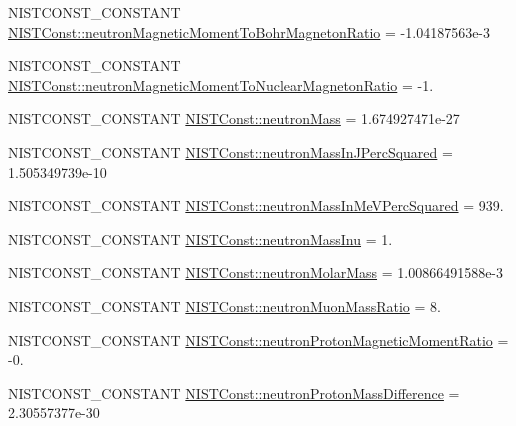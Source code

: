 \begin{DoxyCompactItemize}
\item 
N\+I\+S\+T\+C\+O\+N\+S\+T\+\_\+\+C\+O\+N\+S\+T\+A\+NT \mbox{\hyperlink{group___n_i_s_t_const-_neutron_gab8bdbec377228e9e15b00ca4d0a0a3c0}{N\+I\+S\+T\+Const\+::neutron\+Magnetic\+Moment\+To\+Bohr\+Magneton\+Ratio}} = -\/1.\+04187563e-\/3
\item 
N\+I\+S\+T\+C\+O\+N\+S\+T\+\_\+\+C\+O\+N\+S\+T\+A\+NT \mbox{\hyperlink{group___n_i_s_t_const-_neutron_ga37a4e076d3bfff8197cbd9cdebd2daef}{N\+I\+S\+T\+Const\+::neutron\+Magnetic\+Moment\+To\+Nuclear\+Magneton\+Ratio}} = -\/1.
\item 
N\+I\+S\+T\+C\+O\+N\+S\+T\+\_\+\+C\+O\+N\+S\+T\+A\+NT \mbox{\hyperlink{group___n_i_s_t_const-_neutron_gaff4987a18b550937fb56b37afd74f550}{N\+I\+S\+T\+Const\+::neutron\+Mass}} = 1.\+674927471e-\/27
\item 
N\+I\+S\+T\+C\+O\+N\+S\+T\+\_\+\+C\+O\+N\+S\+T\+A\+NT \mbox{\hyperlink{group___n_i_s_t_const-_neutron_ga15810e363506746df03012432e2a357d}{N\+I\+S\+T\+Const\+::neutron\+Mass\+In\+J\+Perc\+Squared}} = 1.\+505349739e-\/10
\item 
N\+I\+S\+T\+C\+O\+N\+S\+T\+\_\+\+C\+O\+N\+S\+T\+A\+NT \mbox{\hyperlink{group___n_i_s_t_const-_neutron_ga297e6f2449995461e549326eaa3c8abc}{N\+I\+S\+T\+Const\+::neutron\+Mass\+In\+Me\+V\+Perc\+Squared}} = 939.
\item 
N\+I\+S\+T\+C\+O\+N\+S\+T\+\_\+\+C\+O\+N\+S\+T\+A\+NT \mbox{\hyperlink{group___n_i_s_t_const-_neutron_ga60a98d26ad8fd6d4cf7e95a9335fabd3}{N\+I\+S\+T\+Const\+::neutron\+Mass\+Inu}} = 1.
\item 
N\+I\+S\+T\+C\+O\+N\+S\+T\+\_\+\+C\+O\+N\+S\+T\+A\+NT \mbox{\hyperlink{group___n_i_s_t_const-_neutron_ga0dab99bc4c4a4626a04a458989e3f548}{N\+I\+S\+T\+Const\+::neutron\+Molar\+Mass}} = 1.\+00866491588e-\/3
\item 
N\+I\+S\+T\+C\+O\+N\+S\+T\+\_\+\+C\+O\+N\+S\+T\+A\+NT \mbox{\hyperlink{group___n_i_s_t_const-_neutron_gaeb6ef307f53654c093b5f0272c12cee8}{N\+I\+S\+T\+Const\+::neutron\+Muon\+Mass\+Ratio}} = 8.
\item 
N\+I\+S\+T\+C\+O\+N\+S\+T\+\_\+\+C\+O\+N\+S\+T\+A\+NT \mbox{\hyperlink{group___n_i_s_t_const-_neutron_ga7c63abde504ba4e2dcfc17a92737f060}{N\+I\+S\+T\+Const\+::neutron\+Proton\+Magnetic\+Moment\+Ratio}} = -\/0.
\item 
N\+I\+S\+T\+C\+O\+N\+S\+T\+\_\+\+C\+O\+N\+S\+T\+A\+NT \mbox{\hyperlink{group___n_i_s_t_const-_neutron_gaeb775581e4a0461cfb4d2401b297e862}{N\+I\+S\+T\+Const\+::neutron\+Proton\+Mass\+Difference}} = 2.\+30557377e-\/30

\end{DoxyCompactItemize}
